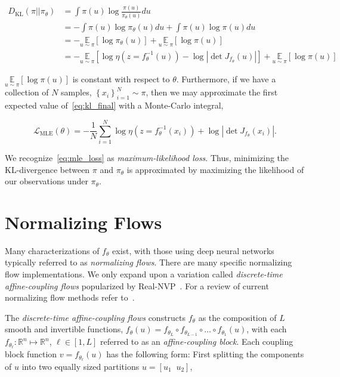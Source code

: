 \begin{align}
    D_{\text{KL}}(\pi || \pi_\theta) &= \int \pi(u) \log \frac{\pi(u)}{\pi_\theta(u)} du \nonumber \\
                                     &= -\int \pi(u) \log \pi_\theta(u) du + \int \pi(u) \log \pi(u) du \nonumber \\
                                     &= -\underset{u \sim \pi}{\mathbb{E}} \left[ \log \pi_\theta(u) \right] + \underset{u \sim \pi}{\mathbb{E}}\left[ \log \pi(u) \right] \nonumber \\
                                     &= -\underset{u \sim \pi}{\mathbb{E}} \left[ \log \eta\left(z = f_\theta^{-1}(u)\right) - \log \left| \det J_{f_\theta}(u) \right| \right] + \underset{u \sim \pi}{\mathbb{E}}\left[ \log \pi(u) \right]
    \label{eq:kl_final}
\end{align}

$\underset{u \sim \pi}{\mathbb{E}}\left[ \log \pi(u) \right]$ is constant with respect to $\theta$.
Furthermore, if we have a collection of $N$ samples,
$\left\{ x_i \right\}_{i=1}^{N} \sim \pi$, then we may approximate the first expected value of~\eqref{eq:kl_final} with
a Monte-Carlo integral,

\begin{equation}
    \mathcal{L}_{\text{MLE}}(\theta) = - \frac{1}{N} \sum_{i=1}^N \log \eta\left(z = f_\theta^{-1}(x_i)\right) + \log \left| \det J_{f_\theta}(x_i) \right|.
    \label{eq:mle_loss}
\end{equation}

We recognize~\eqref{eq:mle_loss} as \textit{maximum-likelihood loss}.
Thus, minimizing the KL-divergence between $\pi$ and $\pi_\theta$ is approximated by maximizing the likelihood of our
observations under $\pi_\theta$.

\section{Normalizing Flows}\label{sec:normalizing-flows}

Many characterizations of $f_\theta$ exist, with those using deep neural networks typically referred to as
\textit{normalizing flows}.
There are many specific normalizing flow implementations.
We only expand upon a variation called \textit{discrete-time affine-coupling flows} popularized by Real-NVP~\cite{real_nvp}.
For a review of current normalizing flow methods refer to~\cite{Kobyzev_2021}.

The \textit{discrete-time affine-coupling flows} constructs $f_\theta$ as the composition of $L$ smooth and invertible functions,
$f_\theta(u) = f_{\theta_L} \circ f_{\theta_{L-1}} \circ \dots \circ f_{\theta_1}(u)$, with each
$f_{\theta_\ell} : \mathbb{R}^n \mapsto \mathbb{R}^n$, $\ell \in [1, L]$ referred to as an \textit{affine-coupling block}.
Each coupling block function $v = f_{\theta_\ell}(u)$ has the following form: First splitting the components of $u$
into two equally sized partitions $u = \left[ u_1 \;\; u_2 \right]$,

